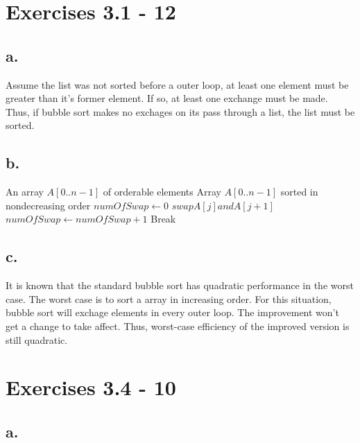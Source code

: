 \documentclass{article}
\begin{document}
\section{Exercises 3.1 - 12}

\subsection*{a.}

Assume the list was not sorted before a outer loop, at least one element must be greater than it's former element. If so, at least one exchange must be made. Thus, if bubble sort makes no exchages on its pass through a list, the list must be sorted.

\subsection*{b.}

\begin{center}
\begin{algorithmic}
\INPUT
An array $A[0..n-1]$ of orderable elements
\OUTPUT
Array $A[0..n-1]$ sorted in nondecreasing order
\State $numOfSwap \leftarrow 0$
\State $swap A[j] and A[j+1]$
\State $numOfSwap \leftarrow numOfSwap + 1$
\EndIf
\EndFor
{}
\State Break
\EndIf
\EndFor
\end{algorithmic}
\end{center}

\subsection*{c.}

It is known that the standard bubble sort has quadratic performance in the worst case. The worst case is to sort a array in increasing order. For this situation, bubble sort will exchage elements in every outer loop. The improvement won't get a change to take affect. Thus, worst-case efficiency of the improved version is still quadratic.

\section{Exercises 3.4 - 10}

\subsection*{a.}
\end{document}

